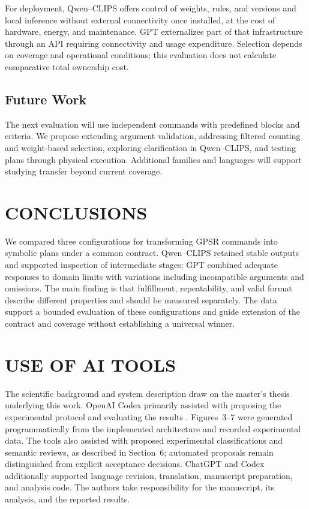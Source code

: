 \documentclass[a4paper,twoside]{article}
\begin{document}
For deployment, Qwen--CLIPS offers control of weights, rules, and versions and local inference without external connectivity once installed, at the cost of hardware, energy, and maintenance. GPT externalizes part of that infrastructure through an API requiring connectivity and usage expenditure. Selection depends on coverage and operational conditions; this evaluation does not calculate comparative total ownership cost.

\subsection{Future Work}
The next evaluation will use independent commands with predefined blocks and criteria. We propose extending argument validation, addressing filtered counting and weight-based selection, exploring clarification in Qwen--CLIPS, and testing plans through physical execution. Additional families and languages will support studying transfer beyond current coverage.

\section{CONCLUSIONS}
We compared three configurations for transforming GPSR commands into symbolic plans under a common contract. Qwen--CLIPS retained stable outputs and supported inspection of intermediate stages; GPT combined adequate responses to domain limits with variations including incompatible arguments and omissions. The main finding is that fulfillment, repeatability, and valid format describe different properties and should be measured separately. The data support a bounded evaluation of these configurations and guide extension of the contract and coverage without establishing a universal winner.





\section*{USE OF AI TOOLS}
The scientific background and system description draw on the master's thesis underlying this work. OpenAI Codex primarily assisted with proposing the experimental protocol and evaluating the results \cite{openai_assistance}. Figures~3--7 were generated programmatically from the implemented architecture and recorded experimental data. The tools also assisted with proposed experimental classifications and semantic reviews, as described in Section~6; automated proposals remain distinguished from explicit acceptance decisions. ChatGPT and Codex additionally supported language revision, translation, manuscript preparation, and analysis code. The authors take responsibility for the manuscript, its analysis, and the reported results.



\end{document}
